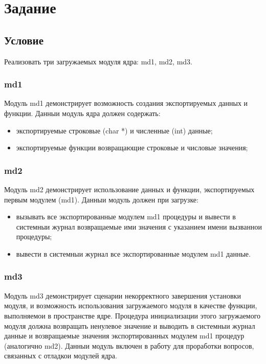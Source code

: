 \chapter{Задание }

\section{Условие}
Реализовать три загружаемых модуля ядра: md1, md2, md3.

\subsection{md1}
Модуль md1 демонстрирует возможность создания экспортируемых данных и функции. Данныи модуль ядра должен содержать:
\begin{itemize}
    \item экспортируемые строковые (char *) и численные (int) данные;
    \item экспортируемые функции возвращающие строковые и числовые значения;
\end{itemize}

\subsection{md2}
Модуль md2 демонстрирует использование данных и функции, экспортируемых первым модулем (md1). Данныи модуль должен при загрузке:
\begin{itemize}
    \item вызывать все экспортированные модулем md1 процедуры и вывести в системныи журнал возвращаемые ими значения с указанием имени вызваннои процедуры;
    \item вывести в системныи журнал все экспортированные модулем md1
данные.
\end{itemize}

\subsection{md3}
Модуль md3 демонстрирует сценарии некорректного завершения установки модуля, и возможность использования загружаемого модуля в качестве функции, выполняемои в пространстве ядре. Процедура инициализации этого загружаемого модуля должна возвращать ненулевое значение и выводить в системныи журнал данные и возвращаемые значения экспортированных модулем md1 процедур (аналогично md2). Данныи модуль включен в работу для проработки вопросов, связанных с отладкои модулей ядра.

